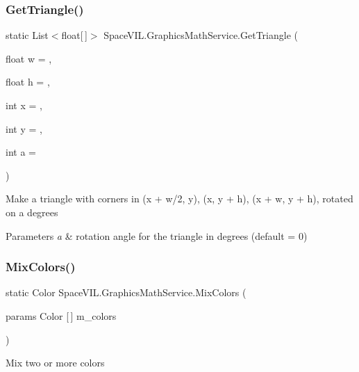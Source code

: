 \subsubsection{\texorpdfstring{Get\+Triangle()}{GetTriangle()}}
{\footnotesize\ttfamily static List$<$float\mbox{[}$\,$\mbox{]}$>$ Space\+V\+I\+L.\+Graphics\+Math\+Service.\+Get\+Triangle (\begin{DoxyParamCaption}\item[{float}]{w = {},  }\item[{float}]{h = {},  }\item[{int}]{x = {},  }\item[{int}]{y = {},  }\item[{int}]{a = {} }\end{DoxyParamCaption})\hspace{0.3cm}{\ttfamily [static]}}



Make a triangle with corners in (x + w/2, y), (x, y + h), (x + w, y + h), rotated on a degrees 


\begin{DoxyParams}{Parameters}
{\em a} & rotation angle for the triangle in degrees (default = 0) \\
\hline
\end{DoxyParams}
\mbox{\label{class_space_v_i_l_1_1_graphics_math_service_a8ab75011a7323b3766254c4b47bdd9b8}} 
\subsubsection{\texorpdfstring{Mix\+Colors()}{MixColors()}}
{\footnotesize\ttfamily static Color Space\+V\+I\+L.\+Graphics\+Math\+Service.\+Mix\+Colors (\begin{DoxyParamCaption}\item[{params Color \mbox{[}$\,$\mbox{]}}]{m\+\_\+colors }\end{DoxyParamCaption})\hspace{0.3cm}{\ttfamily [static]}}



Mix two or more colors 

\mbox{\label{class_space_v_i_l_1_1_graphics_math_service_a3eca6ab5259a561b3f73d8efe30c911e}} 
